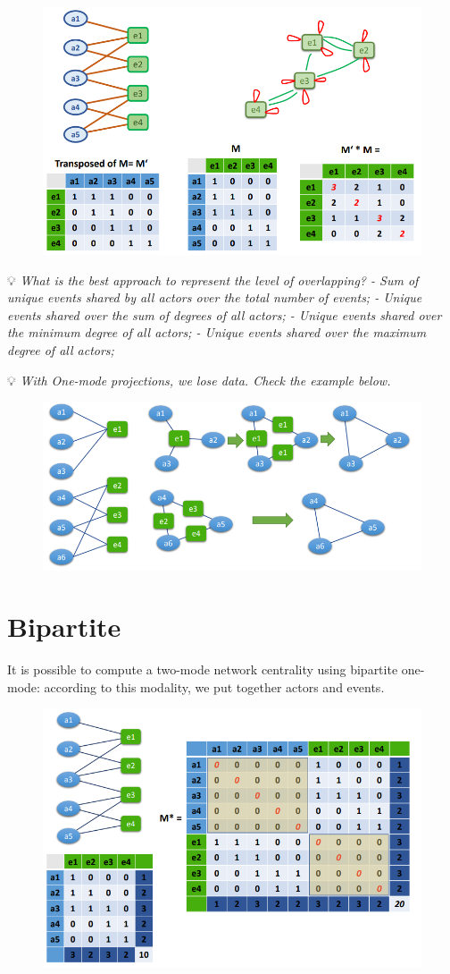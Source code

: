 \documentclass[
  notitlepage,
  onecolumn,
  openany]{book}
\begin{document}
\begin{figure}[h!]

{\centering \includegraphics[width=0.5\linewidth]{images/10-Two mode networks/Untitled} 

}

\end{figure}

💡 \emph{What is the best approach to represent the level of overlapping?
- Sum of unique events shared by all actors over the total number of events;
- Unique events shared over the sum of degrees of all actors;
- Unique events shared over the minimum degree of all actors;
- Unique events shared over the maximum degree of all actors;}

💡 \emph{With One-mode projections, we lose data. Check the example below.}

\begin{figure}[h!]

{\centering \includegraphics[width=0.5\linewidth]{images/10-Two mode networks/Untitled 1} 

}

\end{figure}

\hypertarget{bipartite}{%
\section{Bipartite}\label{bipartite}}

It is possible to compute a two-mode network centrality using bipartite one-mode: according to this modality, we put together actors and events.

\begin{figure}[h!]

{\centering \includegraphics[width=0.5\linewidth]{images/10-Two mode networks/Untitled 2} 

}

\end{figure}
\end{document}
